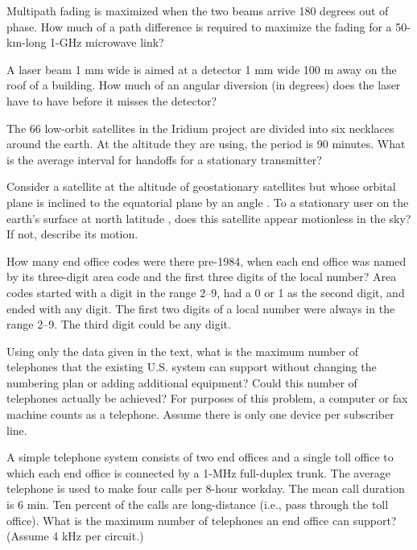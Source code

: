 \documentclass[b5paper,11pt]{memoir}
\begin{document}
Multipath fading is maximized when the two beams arrive 180 degrees out
of phase. How much of a path difference is required to maximize the
fading for a 50-km-long 1-GHz microwave link?

{}

A laser beam 1 mm wide is aimed at a detector 1 mm wide 100 m away on
the roof of a building. How much of an angular diversion (in degrees)
does the laser have to have before it misses the detector?

{}

The 66 low-orbit satellites in the Iridium project are divided into six
necklaces around the earth. At the altitude they are using, the period
is 90 minutes. What is the average interval for handoffs for a
stationary transmitter?

{}

Consider a satellite at the altitude of geostationary satellites but
whose orbital plane is inclined to the equatorial plane by an angle
. To a stationary user on the earth's surface
at north latitude
, does this satellite
appear motionless in the sky? If not, describe its motion.

{}

How many end office codes were there pre-1984, when each end office was
named by its three-digit area code and the first three digits of the
local number? Area codes started with a digit in the range 2--9, had a 0
or 1 as the second digit, and ended with any digit. The first two digits
of a local number were always in the range 2--9. The third digit could
be any digit.

{}

Using {only} the data given in the text, what is the maximum number of
telephones that the existing U.S. system can support without changing
the numbering plan or adding additional equipment? Could this number of
telephones actually be achieved? For purposes of this problem, a
computer or fax machine counts as a telephone. Assume there is only one
device per subscriber line.

{}

A simple telephone system consists of two end offices and a single toll
office to which each end office is connected by a 1-MHz full-duplex
trunk. The average telephone is used to make four calls per 8-hour
workday. The mean call duration is 6 min. Ten percent of the calls are
long-distance (i.e., pass through the toll office). What is the maximum
number of telephones an end office can support? (Assume 4 kHz per
circuit.)
\end{document}
